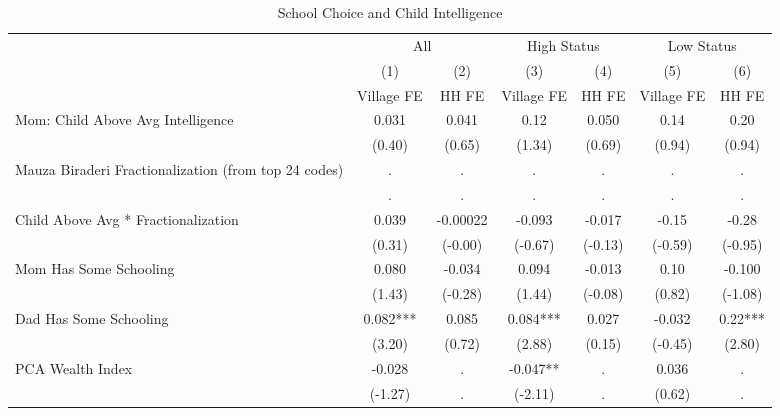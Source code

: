 \begin{table}[htbp]\centering
\def\sym#1{\ifmmode^{#1}\else\(^{#1}\)\fi}
\caption{School Choice and Child Intelligence\label{hhselectioninteraction}}
\begin{tabular}{l*{6}{c}}
\hline\hline
                &\multicolumn{2}{c}{All}  &\multicolumn{2}{c}{High Status}&\multicolumn{2}{c}{Low Status}\\\cmidrule(lr){2-3}\cmidrule(lr){4-5}\cmidrule(lr){6-7}
                &\multicolumn{1}{c}{(1)}&\multicolumn{1}{c}{(2)}&\multicolumn{1}{c}{(3)}&\multicolumn{1}{c}{(4)}&\multicolumn{1}{c}{(5)}&\multicolumn{1}{c}{(6)}\\
                &\multicolumn{1}{c}{Village FE}&\multicolumn{1}{c}{HH FE}&\multicolumn{1}{c}{Village FE}&\multicolumn{1}{c}{HH FE}&\multicolumn{1}{c}{Village FE}&\multicolumn{1}{c}{HH FE}\\
\hline
Mom: Child Above Avg Intelligence&    0.031   &    0.041   &     0.12   &    0.050   &     0.14   &     0.20   \\
                &   (0.40)   &   (0.65)   &   (1.34)   &   (0.69)   &   (0.94)   &   (0.94)   \\
Mauza Biraderi Fractionalization (from top 24 codes)&        .   &        .   &        .   &        .   &        .   &        .   \\
                &        .   &        .   &        .   &        .   &        .   &        .   \\
Child Above Avg * Fractionalization&    0.039   & -0.00022   &   -0.093   &   -0.017   &    -0.15   &    -0.28   \\
                &   (0.31)   &  (-0.00)   &  (-0.67)   &  (-0.13)   &  (-0.59)   &  (-0.95)   \\
Mom Has Some Schooling&    0.080   &   -0.034   &    0.094   &   -0.013   &     0.10   &   -0.100   \\
                &   (1.43)   &  (-0.28)   &   (1.44)   &  (-0.08)   &   (0.82)   &  (-1.08)   \\
Dad Has Some Schooling&    0.082***&    0.085   &    0.084***&    0.027   &   -0.032   &     0.22***\\
                &   (3.20)   &   (0.72)   &   (2.88)   &   (0.15)   &  (-0.45)   &   (2.80)   \\
PCA Wealth Index&   -0.028   &        .   &   -0.047** &        .   &    0.036   &        .   \\
                &  (-1.27)   &        .   &  (-2.11)   &        .   &   (0.62)   &        .   \\

\end{tabular}
\end{table}
